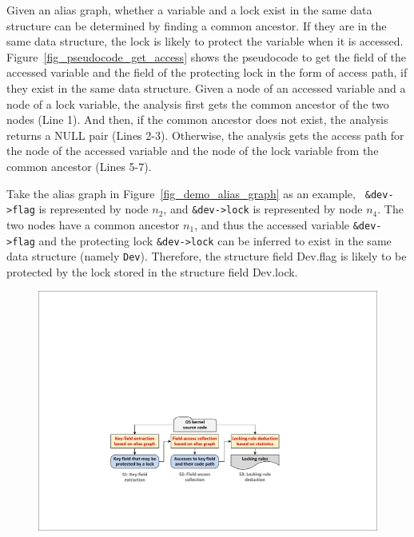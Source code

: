 Given an alias graph, whether a variable and a lock exist in the same data 
structure can be determined by finding a common ancestor. If they are in the 
same data structure, the lock is likely to protect the variable when it is 
accessed. Figure~\ref{fig_pseudocode_get_access} shows the pseudocode to 
get the field of the accessed variable and the field of the protecting lock in 
the form of access path, if they exist in the same data structure. Given a node 
of an accessed variable and a node of a lock variable, the analysis first gets 
the common ancestor of the two nodes (Line 1). And then, if the common ancestor 
does not exist, the analysis returns a NULL pair (Lines 2-3). Otherwise, the 
analysis gets the access path for the node of the accessed variable and the 
node of the lock variable from the common ancestor (Lines 5-7).

Take the alias graph in Figure~\ref{fig_demo_alias_graph} as an example, {\tt 
\&dev->flag} is represented by node $\mathit{n_2}$, and {\tt \&dev->lock} is 
represented by node $\mathit{n_4}$. The two nodes have a common ancestor 
$\mathit{n_1}$, and thus the accessed variable {\tt \&dev->flag} and the 
protecting lock {\tt \&dev->lock} can be inferred to exist in the same data 
structure (namely {\tt Dev}). Therefore, the structure field Dev.flag is likely 
to be protected by the lock stored in the structure field Dev.lock.

\begin{figure}[htbp]
	\centering
	\includegraphics[width=1\linewidth]{figures/fig_workflow.pdf}
	\label{fig_workflow}
\end{figure}

